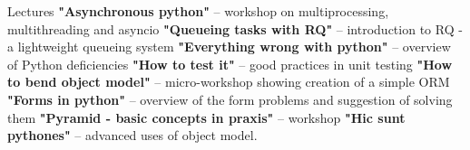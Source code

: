 \begin{rubric}{Lectures}
\entry*[PyConPL 2015]\textbf{"Asynchronous python"} -- workshop on
    multiprocessing, multithreading and asyncio
\textbf{"Queueing tasks with RQ"} -- introduction to
    RQ - a lightweight queueing system
\entry*[PyConPL 2014]\textbf{"Everything wrong with python"} --
    overview of Python deficiencies
\entry*[PyConPL 2013]\textbf{"How to test it"} -- good practices in unit
    testing
\entry*[4developers 2013]\textbf{"How to bend object model"} -- micro-workshop
    showing creation of a simple ORM
\entry*[PyConPL 2012]\textbf{"Forms in python"} -- overview of the form
    problems and suggestion of solving them
\entry*[PyconPL 2012]\textbf{"Pyramid - basic concepts in praxis"} --
    workshop
\entry*[PyConPL 2011]\textbf{"Hic sunt pythones"} -- advanced uses of object
    model.
\end{rubric}
